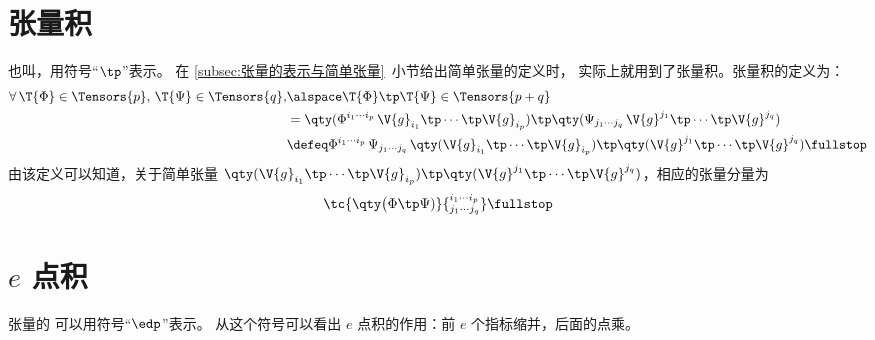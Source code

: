\section{张量积} \label{sec:张量积}
也叫，用符号“$\tp$”表示。
在 \ref{subsec:张量的表示与简单张量}~小节给出简单张量的定义时，
实际上就用到了张量积。张量积的定义为：
\begin{align}
	\forall\,\T{\Phi}\in\Tensors{p},\,\T{\Psi}\in\Tensors{q},
	&\alspace \T{\Phi}\tp\T{\Psi}
		\in\Tensors{p+q} \notag \\
	&=\qty(\Phi^{i_1 \cdots i_p} \,
			\V{g}_{i_1}\tp\cdots\tp\V{g}_{i_p})
		\tp \qty(\Psi_{j_1 \cdots j_q} \,
			\V{g}^{j_1}\tp\cdots\tp\V{g}^{j_q}) \notag \\
	&\defeq \Phi^{i_1 \cdots i_p} \,
		\Psi_{j_1 \cdots j_q}\,
		\qty(\V{g}_{i_1}\tp\cdots\tp\V{g}_{i_p})
		\tp \qty(\V{g}^{j_1}\tp\cdots
			\tp\V{g}^{j_q}_{\phantom{i_p}}) \fullstop
\end{align}
由该定义可以知道，关于简单张量 $\qty(\V{g}_{i_1}\tp\cdots
	\tp\V{g}_{i_p}) \tp \qty(\V{g}^{j_1}\tp\cdots
	\tp\V{g}^{j_q}_{\phantom{i_p}})$，相应的张量分量为
\begin{equation}
	\tc{\qty\big(\Phi\tp\Psi)}
		{^{i_1 \cdots i_p}_{j_1 \cdots j_q}} \fullstop
\end{equation}

\section{\texorpdfstring{$e$ 点积}{e 点积}}
张量的 可以用符号“$\edp$”表示。
从这个符号可以看出 $e$ 点积的作用：前 $e$ 个指标缩并，后面的点乘。

